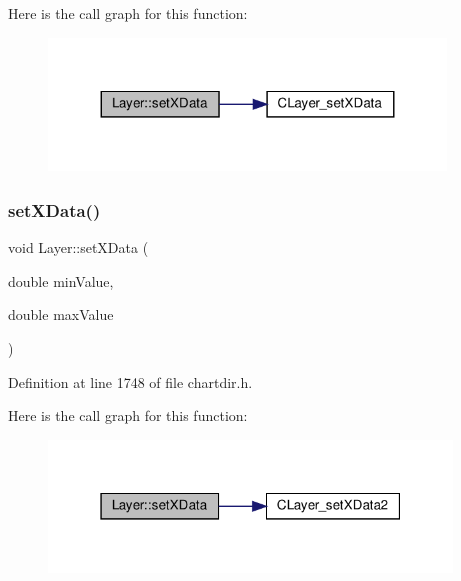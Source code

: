 Here is the call graph for this function\+:
\nopagebreak
\begin{figure}[H]
\begin{center}
\leavevmode
\includegraphics[width=299pt]{class_layer_a6cc7d6e69afe7e9a9c33052f01546f80_cgraph}
\end{center}
\end{figure}
\mbox{\label{class_layer_a1556d7e58c43f25cf4ee0f7357121fbc}} 
\subsubsection{\texorpdfstring{set\+X\+Data()}{setXData()}\hspace{0.1cm}{\footnotesize\ttfamily [2/2]}}
{\footnotesize\ttfamily void Layer\+::set\+X\+Data (\begin{DoxyParamCaption}\item[{double}]{min\+Value,  }\item[{double}]{max\+Value }\end{DoxyParamCaption})\hspace{0.3cm}{\ttfamily [inline]}}



Definition at line 1748 of file chartdir.\+h.

Here is the call graph for this function\+:
\nopagebreak
\begin{figure}[H]
\begin{center}
\leavevmode
\includegraphics[width=304pt]{class_layer_a1556d7e58c43f25cf4ee0f7357121fbc_cgraph}
\end{center}
\end{figure}
\mbox{\label{class_layer_a7a721e59aa2ade3230ba2ad76bab643a}} 
